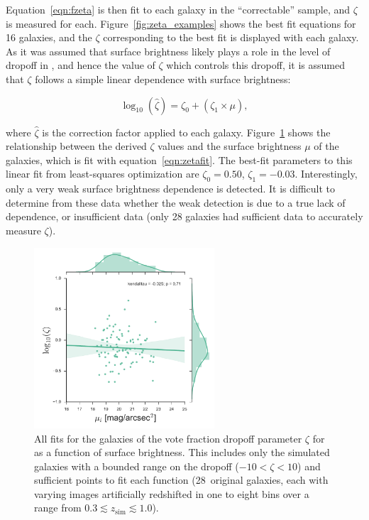 Equation~\ref{eqn:fzeta} is then fit to each galaxy in the ``correctable'' \ferengi{} sample, and $\zeta$ is measured for each. Figure~\ref{fig:zeta_examples} shows the best fit equations for 16 galaxies, and the $\zeta$ corresponding to the best fit is displayed with each galaxy. As it was assumed that surface brightness likely plays a role in the level of dropoff in \ffeatures{}, and hence the value of $\zeta$ which controls this dropoff, it is assumed that $\zeta$ follows a simple linear dependence with surface brightness:


\begin{equation}
\log_{10}(\hat\zeta) = \zeta_0 + (\zeta_1 \times \mu),
\label{eqn:zetafit}
\end{equation}

where $\hat\zeta$ is the correction factor applied to each galaxy. Figure~\ref{fig:zeta_mu} shows the relationship between the derived $\zeta$ values and the surface brightness $\mu$ of the \ferengi{} galaxies, which is fit with equation~\ref{eqn:zetafit}. The best-fit parameters to this linear fit from least-squares optimization are  $\zeta_0=0.50$, $\zeta_1=-0.03$. Interestingly, only a very weak surface brightness dependence is detected. It is difficult to determine from these data whether the weak detection is due to a true lack of dependence, or insufficient data (only 28 galaxies had sufficient data to accurately measure $\zeta$). 

\begin{figure}
\center
\includegraphics[width=0.6\textwidth]{figures/zeta_mu.pdf}
\caption{All fits for the \ferengi{} galaxies of the vote fraction dropoff
parameter $\zeta$ for \ffeatures{} as a function of surface brightness. This
includes only the simulated galaxies with a bounded range on the dropoff
($-10<\zeta<10$) and sufficient points to fit each function (28~original
galaxies, each with varying images artificially redshifted in one to eight bins over a range from $0.3\lesssim z_\mathrm{sim}\lesssim1.0$).}

\label{fig:zeta_mu}
\end{figure}


